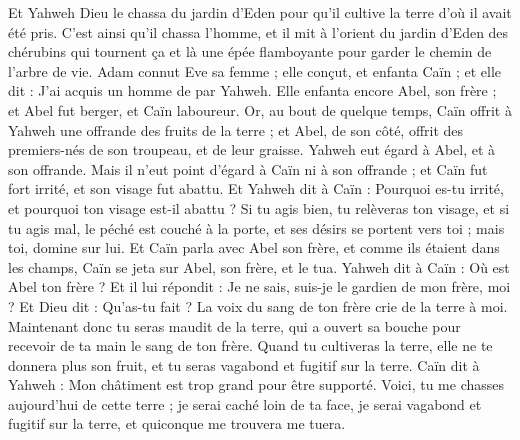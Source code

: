 \begin{multicols}{2}
Et Yahweh Dieu le chassa du jardin d’Eden pour qu’il cultive la terre d’où il avait été pris.
C’est ainsi qu’il chassa l'homme, et il mit à l’orient du jardin d’Eden des chérubins qui tournent ça et là une épée flamboyante pour garder le chemin de l'arbre de vie.
\VerseOne{}Adam connut Eve sa femme ; elle conçut, et enfanta Caïn ; et elle dit : J'ai acquis un homme de par Yahweh.
Elle enfanta encore Abel, son frère ; et Abel fut berger, et Caïn laboureur.
Or, au bout de quelque temps, Caïn offrit à Yahweh une offrande des fruits de la terre ;
et Abel, de son côté, offrit des premiers-nés de son troupeau, et de leur graisse. Yahweh eut égard à Abel, et à son offrande.
Mais il n'eut point d'égard à Caïn ni à son offrande ; et Caïn fut fort irrité, et son visage fut abattu.
Et Yahweh dit à Caïn : Pourquoi es-tu irrité, et pourquoi ton visage est-il abattu ?
Si tu agis bien, tu relèveras ton visage, et si tu agis mal, le péché est couché à la porte, et ses désirs se portent vers toi ;  mais toi, domine sur lui.
Et Caïn parla avec Abel son frère, et comme ils étaient dans les champs, Caïn se jeta sur Abel, son frère, et le tua.
Yahweh dit à Caïn : Où est Abel ton frère ? Et il lui répondit : Je ne sais, suis-je le gardien de mon frère, moi ?
Et Dieu dit : Qu'as-tu fait ? La voix du sang de ton frère crie de la terre à moi.
Maintenant donc tu seras maudit de la terre, qui a ouvert sa bouche pour recevoir de ta main le sang de ton frère.
Quand tu cultiveras la terre, elle ne te donnera plus son fruit, et tu seras vagabond et fugitif sur la terre.
Caïn dit à Yahweh : Mon châtiment est trop grand pour être supporté.
Voici, tu me chasses aujourd'hui de cette terre ; je serai caché loin de ta face, je serai vagabond et fugitif sur la terre, et quiconque me trouvera me tuera.

\end{multicols}
